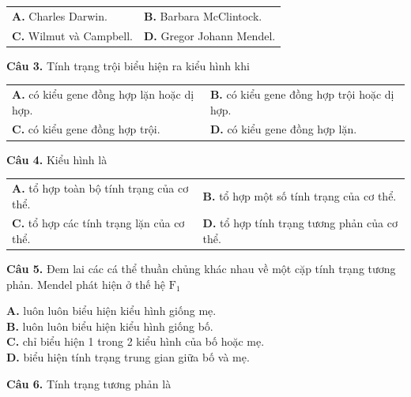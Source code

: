 \documentclass{article}
\begin{document}
\begin{tabularx}{\linewidth}{@{}X X@{}}
\textbf{A.} Charles Darwin. & \textbf{B.} Barbara McClintock.\\[8pt]
\textbf{C.} Wilmut và Campbell. & \textbf{D.} Gregor Johann Mendel.
\end{tabularx}
\vspace*{\fill}
\newpage

\fontsize{26}{34}\selectfont
\textbf{Câu 3.} Tính trạng trội biểu hiện ra kiểu hình khi
\vspace{6pt}

\begin{tabularx}{\linewidth}{@{}X X@{}}
\textbf{A.} có kiểu gene đồng hợp lặn hoặc dị hợp. & \textbf{B.} có kiểu gene đồng hợp trội hoặc dị hợp.\\[8pt]
\textbf{C.} có kiểu gene đồng hợp trội. & \textbf{D.} có kiểu gene đồng hợp lặn.
\end{tabularx}

\vspace*{\fill}

\textbf{Câu 4.} Kiểu hình là
\vspace{6pt}

\begin{tabularx}{\linewidth}{@{}X X@{}}
\textbf{A.} tổ hợp toàn bộ tính trạng của cơ thể. & \textbf{B.} tổ hợp một số tính trạng của cơ thể.\\[8pt]
\textbf{C.} tổ hợp các tính trạng lặn của cơ thể. & \textbf{D.} tổ hợp tính trạng tương phản của cơ thể.
\end{tabularx}
\vspace*{\fill}
\newpage

\fontsize{25}{33}\selectfont
\textbf{Câu 5.} Đem lai các cá thể thuần chủng khác nhau về một cặp tính trạng tương phản. Mendel phát hiện ở thế hệ $\text{F}_1$
\vspace{6pt}

\textbf{A.} luôn luôn biểu hiện kiểu hình giống mẹ.\\
\textbf{B.} luôn luôn biểu hiện kiểu hình giống bố.\\
\textbf{C.} chỉ biểu hiện 1 trong 2 kiểu hình của bố hoặc mẹ.\\
\textbf{D.} biểu hiện tính trạng trung gian giữa bố và mẹ.

\vspace*{\fill}

\textbf{Câu 6.} Tính trạng tương phản là
\vspace{6pt}
\end{document}
